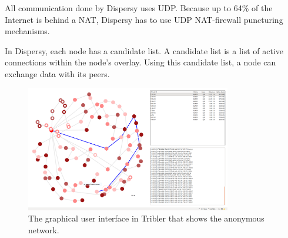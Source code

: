 		All communication done by Dispersy uses UDP. Because up to 64\% of the Internet is behind a NAT, Dispersy has to use UDP NAT-firewall puncturing mechanisms\cite{zeilemaker2013dispersy}.
		
		In Dispersy, each node has a candidate list. A candidate list is a list of active connections within the node's overlay. Using this candidate list, a node can exchange data with its peers.
		
		\begin{figure}[!t]
			\centering
			\includegraphics[width=0.8\textwidth]{prior-work/8hop.png}
			\caption{The graphical user interface in Tribler that shows the anonymous network.}
			\label{fig:anon_downloads}
		\end{figure}